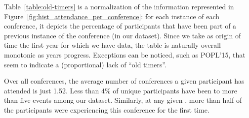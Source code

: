 Table~\ref{table:old-timers} is a normalization of the information represented
in Figure~\ref{fig:hist_attendance_per_conference}: for each instance of each
conference, it depicts the percentage of participants that have been part of a
previous instance of the conference (in our dataset). Since we take as origin of
time the first year for which we have data, the table is naturally overall monotonic
as years progress. Exceptions can be noticed, such as POPL'15, that seem to indicate
a (proportional) lack of ``old timers''.

\begin{obs}
Over all conferences, the average number of conferences a given participant
has attended is just 1.52. Less than 4\% of unique participants have been to
more than five events among our dataset.  Similarly, at any given \event,
more than half of the participants were experiencing this conference for the
first time.
\label{obs:old-timers}
\end{obs}

